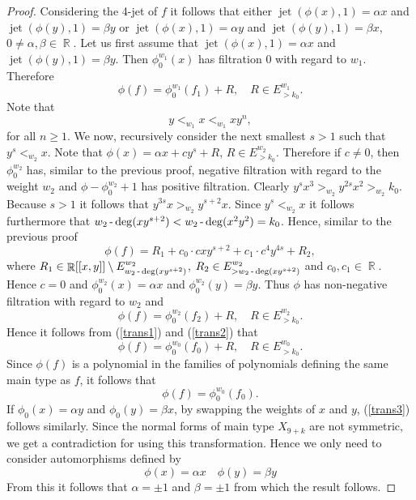\documentclass[noend]{amsproc}
\theoremstyle{definition}
\DeclareMathOperator{\jet}{jet}
\DeclareMathOperator{\R}{\mathbb{R}}
\DeclareMathOperator{\dash}{\textnormal{-}}
\begin{document}
\begin{proof}
Considering the 4-jet of $f$ it follows that either $\jet(\phi(x),1)=\alpha x$ and $\jet(\phi(y),1)=\beta y$ or $\jet(\phi(x),1)=\alpha y$ and $\jet(\phi(y),1)=\beta x$, $0\neq\alpha,\beta\in\R$. Let us first assume that $\jet(\phi(x),1)=\alpha x$ and $\jet(\phi(y),1)=\beta y$. Then $\phi^{w_1}_0(x)$ has filtration $0$ with regard to $w_1$. Therefore
\begin{equation}\label{trans1}
\phi(f)=\phi_0^{w_1}(f_1)+R,\quad R\in E^{w_1}_{>k_0}.
\end{equation} Note that
\begin{equation}\label{orderw1}
y<_{w_1}x<_{w_1}xy^n,
\end{equation}
for all $n\ge 1$. We now, recursively consider the next smallest $s>1$ such that $y^s<_{w_2}x$. Note that $\phi(x)=\alpha x+cy^s+R$, $R\in E^{w_2}_{>k_0}$. Therefore if $c\neq 0$, then $\phi_0^{w_2}$ has, similar to the previous proof, negative filtration with regard to the weight $w_2$ and $\phi-\phi^{w_2}_0+1$ has positive filtration. Clearly $y^sx^3>_{w_2}y^{2s}x^2>_{w_2}k_0$. Because $s>1$ it follows that $y^{3s}x>_{w_2}y^{s+2}x$. Since $y^s<_{w_2}x$ it follows furthermore that $w_2\dash\deg(xy^{s+2})<w_2\dash\deg(x^2y^2)=k_0$. Hence, similar to the previous proof
\begin{equation}
\phi(f)=R_1+c_0\cdot cxy^{s+2}+c_1\cdot c^4y^{4s}+R_2,
\end{equation}
where $R_1\in\R[[x,y]]\setminus E_{w_2\dash\deg(xy^{s+2})}^{w_2}$, $R_2\in E_{>w_2\dash\deg(xy^{s+2})}^{w_2}$ and $c_0,c_1\in\R$.
Hence $c=0$ and $\phi_0^{w_2}(x)=\alpha x$ and $\phi_0^ {w_2}(y)=\beta y$. Thus $\phi$ has non-negative filtration with regard to $w_2$ and
\begin{equation}\label{trans2}
\phi(f)=\phi_0^{w_2}(f_2)+R,\quad R\in E^{w_2}_{>k_0}.
\end{equation}
Hence it follows from (\ref{trans1}) and (\ref{trans2}) that
\begin{equation}
\phi(f)=\phi_0^{w_0}(f_0)+R,\quad R\in E^{w_0}_{>k_0}.
\end{equation}
Since $\phi(f)$ is a polynomial in the families of polynomials defining the same main type as $f$, it follows that
\begin{equation}\label{trans3}
\phi(f)=\phi_0^{w_0}(f_0).
\end{equation}
If $\phi_0(x)=\alpha y$ and $\phi_0(y)=\beta x$, by swapping the weights of $x$ and $y$, (\ref{trans3}) follows similarly.  Since the normal forms of main type $X_{9+k}$ are not symmetric, we get a contradiction for using this transformation. Hence we only need to consider automorphisms defined by
\begin{equation}\label{phi}
\phi(x)=\alpha x\quad\phi(y)=\beta y
\end{equation}
 From this it follows that $\alpha=\pm 1$ and $\beta=\pm 1$ from which the result follows.
\end{proof}
\end{document}
